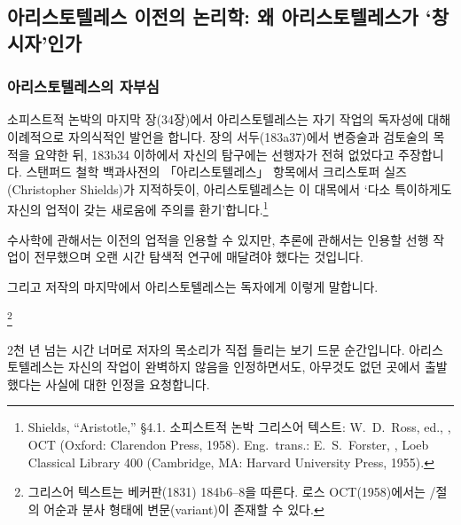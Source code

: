 \documentclass[12pt, a4paper]{article}
\begin{document}
\subsection{아리스토텔레스 이전의 논리학: 왜 아리스토텔레스가 `창시자'인가}

\subsubsection{아리스토텔레스의 자부심}

소피스트적 논박의 마지막 장(34장)에서 아리스토텔레스는 자기 작업의 독자성에 대해 이례적으로 자의식적인 발언을 합니다. 장의 서두(183a37)에서 변증술과 검토술의 목적을 요약한 뒤, 183b34 이하에서 자신의 탐구에는 선행자가 전혀 없었다고 주장합니다. 스탠퍼드 철학 백과사전의 「아리스토텔레스」 항목에서 크리스토퍼 실즈(Christopher Shields)가 지적하듯이, 아리스토텔레스는 이 대목에서 `다소 특이하게도 자신의 업적이 갖는 새로움에 주의를 환기'합니다.\footnote{Shields, ``Aristotle,'' §4.1. 소피스트적 논박 그리스어 텍스트: W.\ D.\ Ross, ed., , OCT (Oxford: Clarendon Press, 1958). Eng.\ trans.: E.\ S.\ Forster, , Loeb Classical Library 400 (Cambridge, MA: Harvard University Press, 1955).}

수사학에 관해서는 이전의 업적을 인용할 수 있지만, 추론에 관해서는 인용할 선행 작업이 전무했으며 오랜 시간 탐색적 연구에 매달려야 했다는 것입니다.


그리고 저작의 마지막에서 아리스토텔레스는 독자에게 이렇게 말합니다.

\footnote{그리스어 텍스트는 베커판(1831) 184b6--8을 따른다. 로스 OCT(1958)에서는 /절의 어순과 분사 형태에 변문(variant)이 존재할 수 있다.}

2천 년 넘는 시간 너머로 저자의 목소리가 직접 들리는 보기 드문 순간입니다. 아리스토텔레스는 자신의 작업이 완벽하지 않음을 인정하면서도, 아무것도 없던 곳에서 출발했다는 사실에 대한 인정을 요청합니다.
\end{document}
